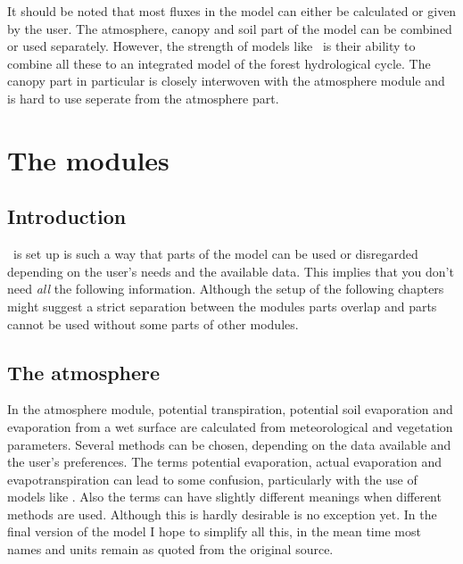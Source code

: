 It should be noted that most fluxes in the model can either be
calculated or given by the user. The atmosphere, canopy and soil part
of the model can be combined or used separately. However, the strength
of models like \vamps\ is their ability to combine all these to an
integrated model of the forest hydrological cycle. The canopy part in
particular is closely interwoven with the atmosphere module and is
hard to use seperate from the atmosphere part. 



\chapter{The modules}

\section{Introduction}
\vamps\ is set up is such a way that parts of the model can be used
or disregarded depending on the user's needs and the available data.
This implies that you don't need {\em all} the following information.
Although the setup of the following chapters might suggest a strict
separation between the modules parts overlap and parts cannot be used
without some parts of other modules.

\section{The atmosphere}
In the atmosphere module, potential transpiration, potential soil
evaporation and evaporation from a wet surface are calculated from
meteorological and vegetation parameters. Several methods can be
chosen, depending on the data available and the user's
preferences. The terms potential evaporation, actual evaporation and
evapotranspiration can lead to some confusion, particularly with the
use of models like \vamps{}. Also the terms can have slightly
different meanings when different methods are used. Although this is
hardly desirable \vamps{} is no exception yet. In the final version of
the model I hope to simplify all this, in the mean time most names and
units remain as quoted from the original source.




